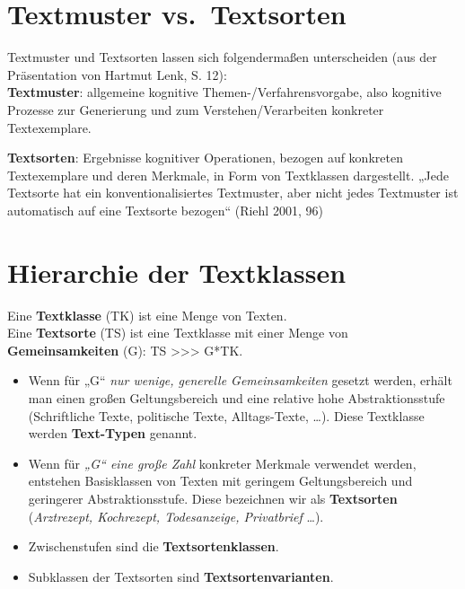 \documentclass[
  letterpaper,
]{scrbook}
\begin{document}
\hypertarget{textmuster-vs.-textsorten}{%
\section{Textmuster vs.~Textsorten}\label{textmuster-vs.-textsorten}}

Textmuster und Textsorten lassen sich folgendermaßen unterscheiden (aus
der Präsentation von Hartmut Lenk, S. 12):\\

\textbf{Textmuster}: allgemeine kognitive Themen-/Verfahrensvorgabe,
also kognitive Prozesse zur Generierung und zum Verstehen/Verarbeiten
konkreter Textexemplare.

\textbf{Textsorten}: Ergebnisse kognitiver Operationen, bezogen auf
konkreten Textexemplare und deren Merkmale, in Form von Textklassen
dargestellt. „Jede Textsorte hat ein konventionalisiertes Textmuster,
aber nicht jedes Textmuster ist automatisch auf eine Textsorte bezogen``
(Riehl 2001, 96)

\hypertarget{hierarchie-der-textklassen}{%
\section{Hierarchie der Textklassen}\label{hierarchie-der-textklassen}}

Eine \textbf{Textklasse} (TK) ist eine Menge von Texten.\\
Eine \textbf{Textsorte} (TS) ist eine Textklasse mit einer Menge von
\textbf{Gemeinsamkeiten} (G): TS \textgreater\textgreater\textgreater{}
G*TK.\\

\begin{itemize}
\item
  Wenn für „G`` \emph{nur wenige, generelle Gemeinsamkeiten} gesetzt
  werden, erhält man einen großen Geltungsbereich und eine relative hohe
  Abstraktionsstufe (Schriftliche Texte, politische Texte,
  Alltags-Texte, \ldots). Diese Textklasse werden \textbf{Text-Typen}
  genannt.\\
\item
  Wenn für \emph{„G`` eine große Zahl} konkreter Merkmale verwendet
  werden, entstehen Basisklassen von Texten mit geringem Geltungsbereich
  und geringerer Abstraktionsstufe. Diese bezeichnen wir als
  \textbf{Textsorten} (\emph{Arztrezept, Kochrezept, Todesanzeige,
  Privatbrief} \ldots).
\item
  Zwischenstufen sind die \textbf{Textsortenklassen}.\\
\item
  Subklassen der Textsorten sind \textbf{Textsortenvarianten}.\\
\end{itemize}
\end{document}
